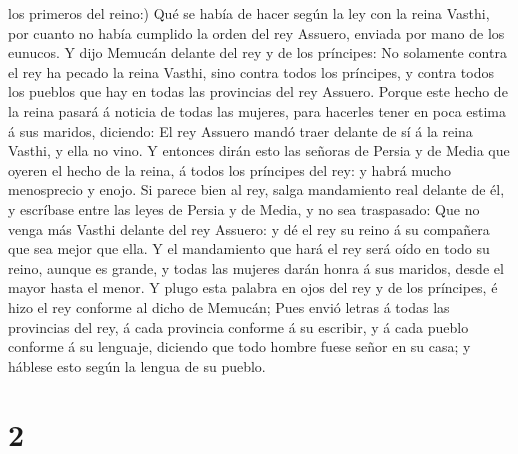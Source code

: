 los primeros del reino:)  Qué se había de hacer según la
ley con la reina Vasthi, por cuanto no había cumplido la orden del rey
Assuero, enviada por mano de los eunucos.  Y dijo Memucán
delante del rey y de los príncipes: No solamente contra el rey ha pecado
la reina Vasthi, sino contra todos los príncipes, y contra todos los
pueblos que hay en todas las provincias del rey Assuero. 
Porque este hecho de la reina pasará á noticia de todas las mujeres,
para hacerles tener en poca estima á sus maridos, diciendo: El rey
Assuero mandó traer delante de sí á la reina Vasthi, y ella no vino.
 Y entonces dirán esto las señoras de Persia y de Media que
oyeren el hecho de la reina, á todos los príncipes del rey: y habrá
mucho menosprecio y enojo.  Si parece bien al rey, salga
mandamiento real delante de él, y escríbase entre las leyes de Persia y
de Media, y no sea traspasado: Que no venga más Vasthi delante del rey
Assuero: y dé el rey su reino á su compañera que sea mejor que ella.
 Y el mandamiento que hará el rey será oído en todo su
reino, aunque es grande, y todas las mujeres darán honra á sus maridos,
desde el mayor hasta el menor.  Y plugo esta palabra en
ojos del rey y de los príncipes, é hizo el rey conforme al dicho de
Memucán;  Pues envió letras á todas las provincias del rey,
á cada provincia conforme á su escribir, y á cada pueblo conforme á su
lenguaje, diciendo que todo hombre fuese señor en su casa; y háblese
esto según la lengua de su pueblo.

\hypertarget{section-1}{%
\section{2}\label{section-1}}

